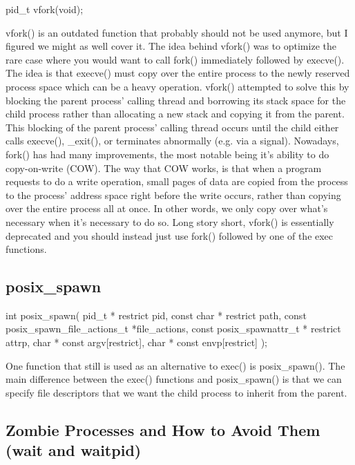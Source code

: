 \documentclass{article}
\begin{document}
\begin{clst}

pid_t vfork(void);

\end{clst}

vfork() is an outdated function that probably should not be used anymore, but I figured we might as well
cover it. The idea behind vfork() was to optimize the rare case where you would want to call fork()
immediately followed by execve(). The idea is that execve() must copy over the entire process to the newly
reserved process space which can be a heavy operation. vfork() attempted to solve this by blocking the parent
process' calling thread and borrowing its stack space for the child process rather than allocating a new stack
and copying it from the parent. This blocking of the parent process' calling thread occurs until the child
either calls execve(), \_exit(), or terminates abnormally (e.g. via a signal). Nowadays, fork() has had many
improvements, the most notable being it's ability to do copy-on-write (COW). The way that COW works, is that
when a program requests to do a write operation, small pages of data are copied from the process to the
process' address space right before the write occurs, rather than copying over the entire process all at once.
In other words, we only copy over what's necessary when it's necessary to do so. Long story short, vfork() is
essentially deprecated and you should instead just use fork() followed by one of the exec functions.

\subsection{posix\_spawn}

\begin{clst}

int posix_spawn(
    pid_t * restrict pid,
    const char * restrict path,
    const posix_spawn_file_actions_t *file_actions,
    const posix_spawnattr_t * restrict attrp,
    char * const argv[restrict],
    char * const envp[restrict]
);

\end{clst}

One function that still is used as an alternative to exec() is posix\_spawn(). The main difference between the
exec() functions and posix\_spawn() is that we can specify file descriptors that we want the child process to
inherit from the parent.

\subsection{Zombie Processes and How to Avoid Them (wait and waitpid)}
\end{document}
